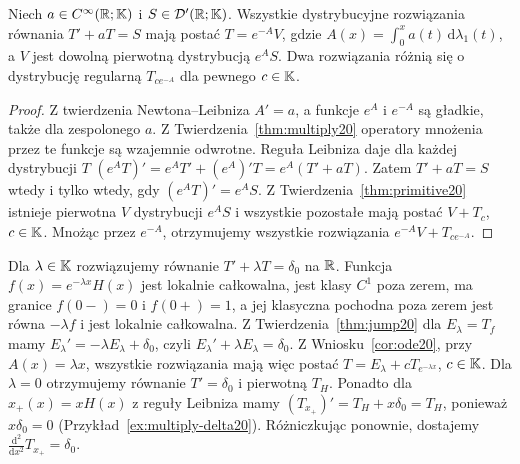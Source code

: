 \begin{wniosek}
\label{cor:ode20}
Niech $a\in C^\infty(\mathbb R;\mathbb K)$ i
$S\in\mathcal D'(\mathbb R;\mathbb K)$. Wszystkie dystrybucyjne
rozwiązania równania $T'+aT=S$ mają postać
$T=e^{-A}V$, gdzie $A(x)=\int_0^xa(t)\,\mathrm d\lambda_1(t)$,
a $V$ jest dowolną pierwotną dystrybucją $e^AS$.
Dwa rozwiązania różnią się o dystrybucję regularną
$T_{c e^{-A}}$ dla pewnego $c\in\mathbb K$.
\end{wniosek}
\begin{proof}
Z twierdzenia Newtona--Leibniza $A'=a$, a funkcje $e^A$
i $e^{-A}$ są gładkie, także dla zespolonego $a$.
Z Twierdzenia~\ref{thm:multiply20} operatory mnożenia
przez te funkcje są wzajemnie odwrotne.
Reguła Leibniza daje dla każdej dystrybucji $T$
$(e^AT)'=e^AT'+(e^A)'T=e^A(T'+aT)$.
Zatem $T'+aT=S$ wtedy i tylko wtedy, gdy
$(e^AT)'=e^AS$. Z Twierdzenia~\ref{thm:primitive20}
istnieje pierwotna $V$ dystrybucji $e^AS$ i wszystkie
pozostałe mają postać $V+T_c$, $c\in\mathbb K$.
Mnożąc przez $e^{-A}$, otrzymujemy wszystkie rozwiązania
$e^{-A}V+T_{ce^{-A}}$.
\end{proof}

\begin{przyklad}
\label{ex:forced-ode20}
Dla $\lambda\in\mathbb K$ rozwiązujemy równanie
$T'+\lambda T=\delta_0$ na $\mathbb R$.
Funkcja $f(x)=e^{-\lambda x}H(x)$ jest lokalnie całkowalna,
jest klasy $C^1$ poza zerem, ma granice $f(0-)=0$ i
$f(0+)=1$, a jej klasyczna pochodna poza zerem jest równa
$-\lambda f$ i jest lokalnie całkowalna.
Z Twierdzenia~\ref{thm:jump20} dla $E_\lambda=T_f$ mamy
$E_\lambda'=-\lambda E_\lambda+\delta_0$, czyli
$E_\lambda'+\lambda E_\lambda=\delta_0$.
Z Wniosku~\ref{cor:ode20}, przy $A(x)=\lambda x$,
wszystkie rozwiązania mają więc postać
$T=E_\lambda+cT_{e^{-\lambda x}}$, $c\in\mathbb K$.
Dla $\lambda=0$ otrzymujemy równanie $T'=\delta_0$
i pierwotną $T_H$.
Ponadto dla $x_+(x)=xH(x)$ z reguły Leibniza mamy
$(T_{x_+})'=T_H+x\delta_0=T_H$, ponieważ
$x\delta_0=0$ (Przykład~\ref{ex:multiply-delta20}).
Różniczkując ponownie, dostajemy
$\frac{\mathrm d^2}{\mathrm dx^2}T_{x_+}=\delta_0$.
\end{przyklad}

